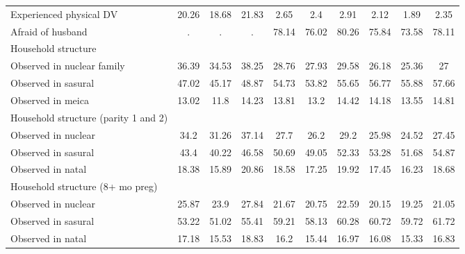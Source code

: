\begin{tabular}{l*{9}{c}}
Experienced physical DV&       20.26&       18.68&       21.83&        2.65&         2.4&        2.91&        2.12&        1.89&        2.35\\
Afraid of husband   &           .&           .&           .&       78.14&       76.02&       80.26&       75.84&       73.58&       78.11\\
\midrule
Household structure &            &            &            &            &            &            &            &            &            \\
Observed in nuclear family&       36.39&       34.53&       38.25&       28.76&       27.93&       29.58&       26.18&       25.36&          27\\
Observed in sasural &       47.02&       45.17&       48.87&       54.73&       53.82&       55.65&       56.77&       55.88&       57.66\\
Observed in meica   &       13.02&        11.8&       14.23&       13.81&        13.2&       14.42&       14.18&       13.55&       14.81\\
\midrule
Household structure (parity 1 and 2)&            &            &            &            &            &            &            &            &            \\
Observed in nuclear &        34.2&       31.26&       37.14&        27.7&        26.2&        29.2&       25.98&       24.52&       27.45\\
Observed in sasural &        43.4&       40.22&       46.58&       50.69&       49.05&       52.33&       53.28&       51.68&       54.87\\
Observed in natal   &       18.38&       15.89&       20.86&       18.58&       17.25&       19.92&       17.45&       16.23&       18.68\\
\midrule
Household structure (8+ mo preg)&            &            &            &            &            &            &            &            &            \\
Observed in nuclear &       25.87&        23.9&       27.84&       21.67&       20.75&       22.59&       20.15&       19.25&       21.05\\
Observed in sasural &       53.22&       51.02&       55.41&       59.21&       58.13&       60.28&       60.72&       59.72&       61.72\\
Observed in natal   &       17.18&       15.53&       18.83&        16.2&       15.44&       16.97&       16.08&       15.33&       16.83\\
\bottomrule
\end{tabular}
